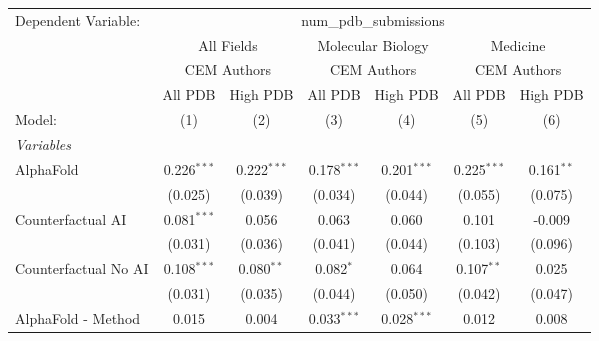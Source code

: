 \begingroup
\centering
\begin{tabular}{lcccccc}
   \tabularnewline \midrule \midrule
   Dependent Variable: & \multicolumn{6}{c}{num\_pdb\_submissions}\\
 & \multicolumn{2}{c}{All Fields} & \multicolumn{2}{c}{Molecular Biology} & \multicolumn{2}{c}{Medicine} \\
\cmidrule(lr){2-3} \cmidrule(lr){4-5} \cmidrule(lr){6-7}
 & \multicolumn{2}{c}{CEM Authors} & \multicolumn{2}{c}{CEM Authors} & \multicolumn{2}{c}{CEM Authors} \\
\cmidrule(lr){2-3} \cmidrule(lr){4-5} \cmidrule(lr){6-7}
 & \multicolumn{1}{c}{All PDB} & \multicolumn{1}{c}{High PDB} & \multicolumn{1}{c}{All PDB} & \multicolumn{1}{c}{High PDB} & \multicolumn{1}{c}{All PDB} & \multicolumn{1}{c}{High PDB} \\
\cmidrule(lr){2-2} \cmidrule(lr){3-3} \cmidrule(lr){4-4} \cmidrule(lr){5-5} \cmidrule(lr){6-6} \cmidrule(lr){7-7}
   Model:                                                     & (1)           & (2)           & (3)            & (4)           & (5)           & (6)\\  
   \midrule
   \emph{Variables}\\
   AlphaFold                                                  & 0.226$^{***}$ & 0.222$^{***}$ & 0.178$^{***}$  & 0.201$^{***}$ & 0.225$^{***}$ & 0.161$^{**}$\\   
                                                              & (0.025)       & (0.039)       & (0.034)        & (0.044)       & (0.055)       & (0.075)\\   
   Counterfactual AI                                          & 0.081$^{***}$ & 0.056         & 0.063          & 0.060         & 0.101         & -0.009\\   
                                                              & (0.031)       & (0.036)       & (0.041)        & (0.044)       & (0.103)       & (0.096)\\   
   Counterfactual No AI                                       & 0.108$^{***}$ & 0.080$^{**}$  & 0.082$^{*}$    & 0.064         & 0.107$^{**}$  & 0.025\\   
                                                              & (0.031)       & (0.035)       & (0.044)        & (0.050)       & (0.042)       & (0.047)\\   
   AlphaFold - Method                                         & 0.015         & 0.004         & 0.033$^{***}$  & 0.028$^{***}$ & 0.012         & 0.008\\   

\end{tabular}
